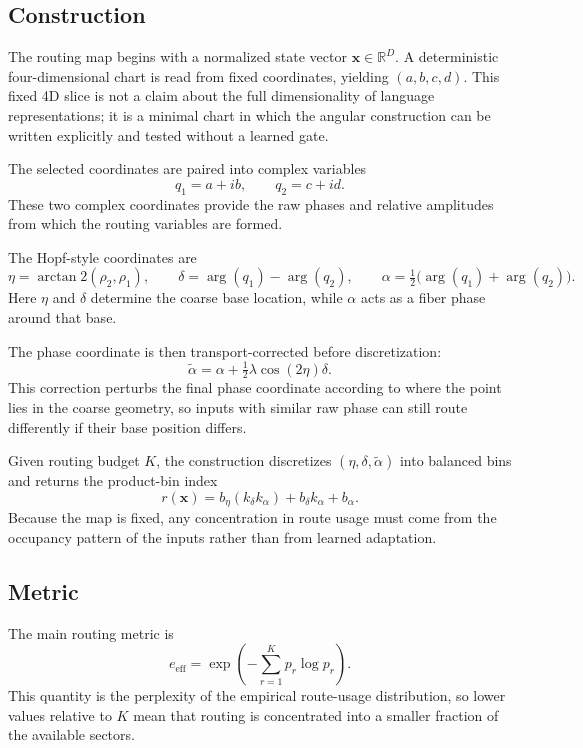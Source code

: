 \documentclass[10pt,twocolumn,letterpaper]{article}
\begin{document}
\subsection{Construction}
The routing map begins with a normalized state vector \(\mathbf{x}\in\mathbb{R}^{D}\). A deterministic four-dimensional chart is read from fixed coordinates, yielding \((a,b,c,d)\). This fixed 4D slice is not a claim about the full dimensionality of language representations; it is a minimal chart in which the angular construction can be written explicitly and tested without a learned gate.

The selected coordinates are paired into complex variables
\begin{equation}
q_1 = a+ib, \qquad q_2 = c+id.
\end{equation}
These two complex coordinates provide the raw phases and relative amplitudes from which the routing variables are formed.

The Hopf-style coordinates are
\begin{equation}
\eta = \arctan2(\rho_2,\rho_1), \qquad
\delta = \arg(q_1)-\arg(q_2), \qquad
\alpha = \tfrac{1}{2}\bigl(\arg(q_1)+\arg(q_2)\bigr).
\label{eq:hopfcoords}
\end{equation}
Here \(\eta\) and \(\delta\) determine the coarse base location, while \(\alpha\) acts as a fiber phase around that base.

The phase coordinate is then transport-corrected before discretization:
\begin{equation}
\tilde{\alpha} = \alpha + \tfrac{1}{2}\lambda\cos(2\eta)\delta.
\label{eq:transport}
\end{equation}
This correction perturbs the final phase coordinate according to where the point lies in the coarse geometry, so inputs with similar raw phase can still route differently if their base position differs.

Given routing budget \(K\), the construction discretizes \((\eta,\delta,\tilde{\alpha})\) into balanced bins and returns the product-bin index
\begin{equation}
r(\mathbf{x}) = b_\eta (k_\delta k_\alpha) + b_\delta k_\alpha + b_\alpha.
\end{equation}
Because the map is fixed, any concentration in route usage must come from the occupancy pattern of the inputs rather than from learned adaptation.

\subsection{Metric}
The main routing metric is
\begin{equation}
e_{\mathrm{eff}} = \exp\!\left(-\sum_{r=1}^{K} p_r \log p_r\right).
\label{eq:footprint}
\end{equation}
This quantity is the perplexity of the empirical route-usage distribution, so lower values relative to \(K\) mean that routing is concentrated into a smaller fraction of the available sectors.
\end{document}

